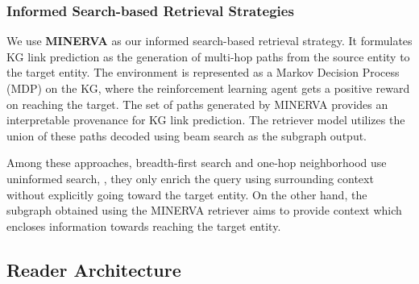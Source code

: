 \subsubsection{Informed Search-based Retrieval Strategies}

We use \textbf{MINERVA} \citep{das2018go} as our informed search-based retrieval strategy.
It formulates KG link prediction as the generation of multi-hop paths from the source entity to the target entity. The environment is represented as a Markov Decision Process (MDP) on the KG, where the reinforcement learning agent gets a positive reward on reaching the target. The set of paths generated by MINERVA provides an interpretable provenance for KG link prediction. The retriever model utilizes the union of these paths decoded using beam search as the subgraph output.



Among these approaches, breadth-first search and one-hop neighborhood use uninformed search, \ie, they only enrich the query using surrounding context without explicitly going toward the target entity. On the other hand, the subgraph obtained using the MINERVA retriever aims to provide context which encloses information towards reaching the target entity.

\subsection{Reader Architecture}

